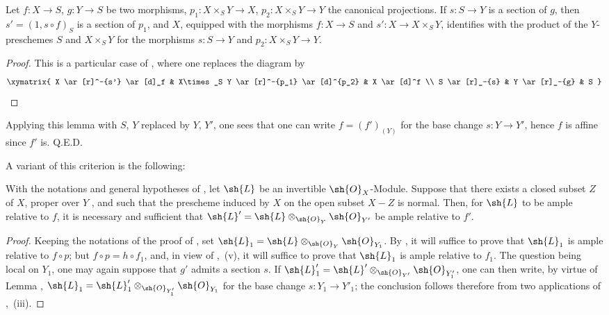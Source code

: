 \begin{lemma}[14.5.11.1]
\label{IV.14.5.11.1}
Let $f:X\to S$, $g:Y\to S$ be two morphisms, $p_1:X\times_S Y\to X$, $p_2:X\times_S Y\to Y$ the canonical projections.
If $s:S\to Y$ is a section of $g$, then $s'=(1,s\circ f)_S$ is a section of $p_1$, and $X$, equipped with the morphisms $f:X\to S$ and $s':X\to X\times_S Y$, identifies with the product of the $Y$-preschemes $S$ and $X\times_S Y$ for the morphisms $s:S\to Y$ and $p_2:X\times_S Y\to Y$.
\end{lemma}

\begin{proof}
This is a particular case of , where one replaces the diagram by
\[
\xymatrix{
  X \ar[r]^-{s'} \ar[d]_f & X\times_S Y \ar[r]^-{p_1} \ar[d]^{p_2} & X \ar[d]^f \\
  S \ar[r]_-{s} & Y \ar[r]_-{g} & S
}
\]
\end{proof}

Applying this lemma with $S$, $Y$ replaced by $Y$, $Y'$, one sees that one can write $f=(f')_{(Y)}$ for the base change $s:Y\to Y'$, hence $f$ is affine since $f'$ is.
Q.E.D.

A variant of this criterion is the following:

\begin{corollary}[14.5.12]
\label{IV.14.5.12}
With the notations and general hypotheses of , let $\sh{L}$ be an invertible $\sh{O}_X$-Module.
Suppose that there exists a closed subset $Z$ of $X$, proper over $Y$ , and such that the prescheme induced by $X$ on the open subset $X-Z$ is normal.
Then, for $\sh{L}$ to be ample relative to $f$, it is necessary and sufficient that $\sh{L}'=\sh{L}\otimes_{\sh{O}_Y}\sh{O}_{Y'}$ be ample relative to $f'$.
\end{corollary}

\begin{proof}
Keeping the notations of the proof of , set $\sh{L}_1=\sh{L}\otimes_{\sh{O}_Y}\sh{O}_{Y_1}$.
By , it will suffice to prove that $\sh{L}_1$ is ample relative to $f\circ p$; but $f\circ p=h\circ f_1$, and, in view of ,~(v), it will suffice to prove that $\sh{L}_1$ is ample relative to $f_1$.
The question being local on $Y_1$, one may again suppose that $g'$ admits a section $s$.
If $\sh{L}'_1=\sh{L}'\otimes_{\sh{O}_{Y'}}\sh{O}_{Y'_1}$, one can then write, by virtue of Lemma , $\sh{L}_1=\sh{L}'_1\otimes_{\sh{O}_{Y'_1}}\sh{O}_{Y_1}$ for the base change $s:Y_1\to Y'_1$; the conclusion follows therefore from two applications of ,~(iii).
\end{proof}
